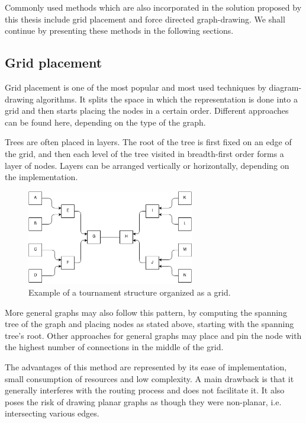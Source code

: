 Commonly used methods which are also incorporated in the solution proposed by this thesis include grid placement and 
force directed graph-drawing. We shall continue by presenting these methods in the following sections.

\subsection{Grid placement}

Grid placement is one of the most popular and most used techniques by diagram-drawing algorithms. It splits the space in 
which the representation is done into a grid and then starts placing the nodes in a certain order. Different approaches 
can be found here, depending on the type of the graph. 

Trees are often placed in layers. The root of the tree is first fixed on an edge of the grid, and then each level of the tree 
visited in breadth-first order forms a layer of nodes. Layers can be arranged vertically or horizontally, depending on the implementation.

\begin{figure}[ht] \centering
\includegraphics[width=0.65\textwidth]{img/algdesing/grid_example.png}
\caption{Example of a tournament structure organized as a grid.} \end{figure}

More general graphs may also follow this pattern, by computing the spanning tree of the graph and placing nodes as stated above, 
starting with the spanning tree's root. Other approaches for general graphs may place and pin the node with the highest number of 
connections in the middle of the grid.

The advantages of this method are represented by its ease of implementation, small consumption of resources and low complexity. A main drawback 
is that it generally interferes with the routing process and does not facilitate it. It also poses the risk of drawing planar graphs as though 
they were non-planar, i.e. intersecting various edges.

